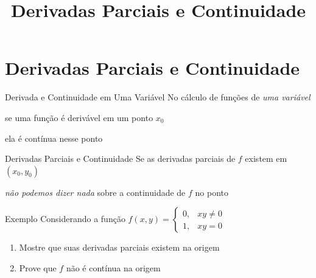 
\usepackage{calculo_varias_variaveis-1}

\title{Derivadas Parciais e Continuidade}



\addtitle

\section{Derivadas Parciais e Continuidade}

\begin{frame}{Derivada e Continuidade em Uma Variável}
  No cálculo de funções de \emph{uma variável}

  \pause
  se uma função é derivável em um ponto $x_0$

  \pause
  ela é contínua nesse ponto
\end{frame}

\begin{frame}{Derivadas Parciais e Continuidade}
  Se as derivadas parciais de $f$ existem em $(x_0, y_0)$

  \pause
  \emph{não podemos dizer nada} sobre a continuidade de $f$ no ponto
\end{frame}

\addtocounter{exemplo}{1}
\begin{frame}{Exemplo \theexemplo}
  Considerando a função
  \(
  f(x, y) = \begin{cases}
    0, & xy \neq 0 \\
    1, & xy = 0
  \end{cases}
  \)
  \begin{enumerate}
    \item Mostre que suas derivadas parciais existem na origem
    \item Prove que $f$ não é contínua na origem
  \end{enumerate}
\end{frame}

